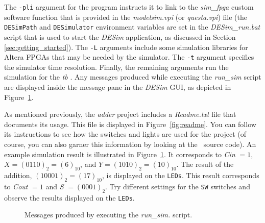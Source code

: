 {

The \texttt{-pli} argument for the   \fi program instructs 
it to link to the {\it sim\_fpga} custom software function that is provided in the
{\it modelsim.vpi} (or {\it questa.vpi}) file (the \texttt{DESimPath} and
\texttt{DESimulator} environment variables are set in the {\it DESim\_run.bat} script that is
used to start the {\it DESim} application, as discussed in Section \ref{sec:getting_started}).
The \texttt{-L} arguments include some simulation libraries for
Altera FPGAs that may be needed by the simulator. The \texttt{-t} argument specifies
the simulator time resolution. Finally, the remaining arguments 
run the simulation for the {\it tb} \hdlModuleName. Any messages 
produced while executing the {\it run\_sim} script are displayed inside the message pane in
the {\it DESim} GUI, as depicted in Figure~\ref{fig:sim}.

As mentioned previously, the {\it adder} project includes a {\it Readme.txt} file that
documents its usage. This file is displayed in Figure~\ref{fig:readme}. You can follow
its instructions to see how the switches and lights are used for the project (of course, 
you can also garner this information by looking at the \hdlName~source code). An example
simulation result is illustrated in Figure~\ref{fig:sim}. It corresponds to {\it Cin} $= 1$,
$X = (0110)_2 = (6)_{10}$, and $Y = (1010)_2 = (10)_{10}$. The result of the addition,
$(10001)_2 = (17)_{10}$, is displayed on the \texttt{LEDs}. This result corresponds
to {\it Cout} $= 1$ and {\it S} $= (0001)_2$.  Try different settings for the
\texttt{SW} switches and observe the results displayed on the \texttt{LEDs}.

\begin{figure}[h]
	\begin{center}
        \setlength{\fboxsep}{0pt}
	\end{center}
          \caption{Messages produced by executing the {\it run\_sim.} script.}
	\label{fig:sim}
\end{figure}

}
